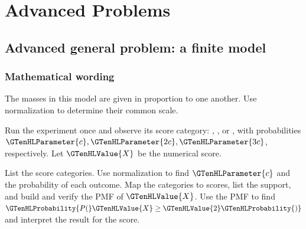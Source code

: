 
\section{Advanced Problems}\label{sec:t2-c1-advanced}


\subsection{Advanced general problem: a finite model}
\label{subsec:t2-c1-advanced-general-problem-a-finite-model}
\subsubsection*{Mathematical wording}
The masses in this model are given in proportion to one another. Use normalization to determine their common scale.

Run the experiment once and observe its score category: , , or , with probabilities $\GTenHLParameter{c},\GTenHLParameter{2c},\GTenHLParameter{3c}$, respectively. Let $\GTenHLValue{X}$ be the numerical score.

    {List the score categories. Use normalization to find $\GTenHLParameter{c}$ and the probability of each outcome.}
    {Map the categories to scores, list the support, and build and verify the PMF of $\GTenHLValue{X}$.}
    {Use the PMF to find $\GTenHLProbability{P(}\GTenHLValue{X}\geq\GTenHLValue{2}\GTenHLProbability{)}$ and interpret the result for the score.}

